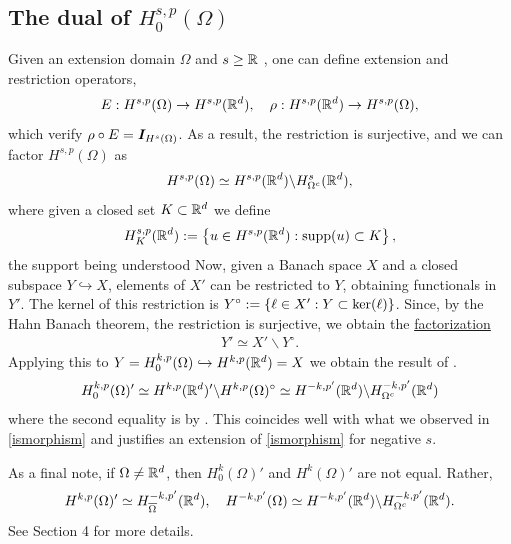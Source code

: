 \documentclass[
    a4paper,
    DIV=14,
    abstract=true,
    numbers=noenddot
]{scrartcl}
\begin{document}
\subsection{The dual of $H^{s,p}_0(\Omega)$}
Given an extension domain $\Omega $ and $s \geq \mathbb{R}$ , one can define extension and restriction operators,
\begin{align*}
    E:H^{s,p}(\Omega ) \to H^{s,p}(\mathbb{R}^d), \quad \rho: H^{s,p}(\mathbb{R}^d) \to H^{s,p}(\Omega ),
\end{align*}
which verify $\rho \circ E = \bm{I}_{H^s(\Omega )}$. As a result, the restriction is surjective, and we can factor $H^{s,p}(\Omega )$ as
\begin{align}\label{ismorphism}
    H^{s,p}(\Omega )\simeq H^{s,p}(\mathbb{R}^d)\backslash H^s_{\Omega^c}(\mathbb{R}^d ),
\end{align}
where given a closed set $K \subset \mathbb{R}^d$ we define
\begin{align*}
    H^{s,p}_K(\mathbb{R}^d):= \left\{u \in H^{s,p}(\mathbb{R}^d): \mathrm{supp}(u) \subset K\right\},
\end{align*}
the support being understood 
Now, given a Banach space $X$ and a closed subspace $Y \hookrightarrow X$, elements of $X'$ can be restricted to $Y$, obtaining functionals in $Y'$. The kernel of this restriction is $Y^\circ:=\left\{\ell \in X': Y \subset \mathrm{ker}(\ell)\right\}$. Since, by the Hahn Banach theorem, the restriction is surjective, we obtain the \href{https://math.la.asu.edu/~quigg/teach/courses/578/2008/notes/adjoints.pdf}{factorization}
\begin{align}\label{dual isomormphism}
    Y' \simeq X'\backslash Y^\circ.
\end{align}
Applying this to $Y= H^{k,p}_0(\Omega )\hookrightarrow H^{k,p}(\mathbb{R}^d) =X$ we obtain the result of .
\begin{align*}
    H^{k,p}_0(\Omega )' \simeq H^{k,p}(\mathbb{R}^d)'\backslash H^{k,p}(\Omega)^\circ\simeq H^{-k,p'}(\mathbb{R}^d)\backslash H^{-k,p'}_{\Omega^c}(\mathbb{R}^d )
\end{align*}
where the second equality is by . This coincides well with what we observed in \eqref{ismorphism} and justifies an extension of \eqref{ismorphism} for negative $s$.

As a final note, if $\Omega \neq \mathbb{R}^d$, then  $H_0^k(\Omega )'$ and $H^k(\Omega )'$ are not equal. Rather,
\begin{align*}
    H^{k,p}(\Omega )'\simeq H_{\overline{\Omega } }^{-k,p'}(\mathbb{R}^d), \quad H^{-k,p'}(\Omega ) \simeq H^{-k,p'}(\mathbb{R}^d)\backslash H^{-k,p'}_{\Omega ^c }(\mathbb{R}^d).
\end{align*}
See \cite{taylor2013partial} Section 4 for more details.
\end{document}

